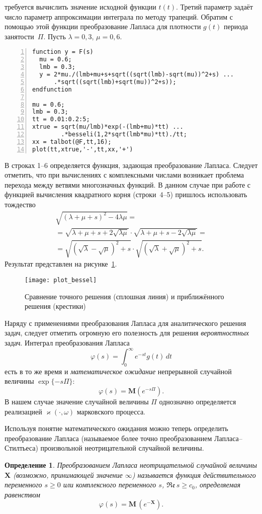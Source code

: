 \documentclass[10pt,oneside,final]{book}
\newcommand{\M}{{\mathbf M}}
\newtheorem{definition}{\color{CadetBlue}Определение}
\begin{document}
требуется вычислить значение исходной функции $t(t)$. Третий параметр задаёт
число параметр аппроксимации интеграла по методу трапеций. Обратим с помощью этой
функции преобразование Лапласа для плотности $g(t)$ периода занятости~$\Pi$. Пусть
$\lambda=0{,}3$, $\mu=0{,}6$. 
\begin{Verbatim}[frame=single,xleftmargin=2em,numbers=left]
function y = F(s)
  mu = 0.6;
  lmb = 0.3;
  y = 2*mu./(lmb+mu+s+sqrt((sqrt(lmb)-sqrt(mu))^2+s) ...
      .*sqrt((sqrt(lmb)+sqrt(mu))^2+s));
endfunction

mu = 0.6;
lmb = 0.3;
tt = 0.01:0.2:5;
xtrue = sqrt(mu/lmb)*exp(-(lmb+mu)*tt) ...
        .*besseli(1,2*sqrt(lmb*mu)*tt)./tt;
xx = talbot(@F,tt,16);
plot(tt,xtrue,'-',tt,xx,'+')
\end{Verbatim}

В строках 1--6 определяется функция, задающая преобразование Лапласа. Следует
отметить, что при вычислениях с комплексными числами возникает проблема перехода
между ветвями многозначных функций. В данном случае при работе с
функцией вычисления квадратного корня (строки~4--5) пришлось использовать
тождество
\begin{multline*}
\sqrt{(\lambda+\mu+s)^2-4\lambda\mu}=
\\ =
\sqrt{\lambda+\mu+s+2\sqrt{\lambda\mu}} \cdot
\sqrt{\lambda+\mu+s-2\sqrt{\lambda\mu}}=
\\ =
\sqrt{(\sqrt\lambda-\sqrt\mu)^2+s} \cdot
\sqrt{(\sqrt\lambda+\sqrt\mu)^2+s}.
\end{multline*}
Результат представлен на рисунке~\ref{fig:bes}.

\begin{figure}[thb]
  \centering
  \texttt{[image: plot\_bessel]}
  \caption{Сравнение точного решения (сплошная линия) и приближённого решения
    (крестики)
    \label{fig:bes}}
\end{figure}

Наряду с применениями преобразования Лапласа для аналитического решения задач,
следует отметить огромную его полезность для решения \emph{вероятностных}
задач. Интеграл преобразования Лапласа
\[
\varphi(s)=\int_0^\infty e^{-st}g(t)\,dt
\]
есть в то же время и \emph{математическое ожидание} непрерывной случайной
величины $\exp\{-s\Pi\}$:
\[
\varphi(s)=\M( e^{-s\Pi}).
\] 
В нашем случае значение случайной величины $\Pi$
однозначно определяется реализацией $\varkappa(\cdot, \omega)$ марковского
процесса. 

Используя понятие математического ожидания можно теперь определить
преобразование Лапласа (называемое более точно преобразованием
Лапласа--Стилтьеса) произвольной неотрицательной случайной величины.
\begin{definition}
  Преобразованием Лапласа неотрицательной случайной величины $\boldsymbol{X}$
  (возможно, принимающей значение $\infty$) называется функция действительного
  переменного $s\geqslant0$ или комплексного переменного $s$, 
  $\mathfrak{Re}\,s\geqslant c_0$, определяемая равенством
  \[
  \varphi(s)=\M\,(e^{-\boldsymbol{X}}).
  \]
\end{definition}
\end{document}

